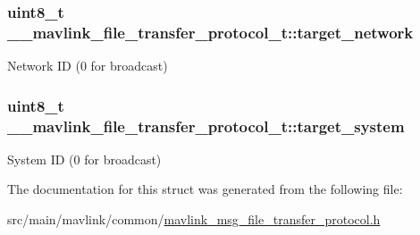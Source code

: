 \hypertarget{struct____mavlink__file__transfer__protocol__t_a183206976ca740c583a75d27187930c3}{
\subsubsection[{target\+\_\+network}]{\setlength{\rightskip}{0pt plus 5cm}uint8\+\_\+t \+\_\+\+\_\+mavlink\+\_\+file\+\_\+transfer\+\_\+protocol\+\_\+t\+::target\+\_\+network}}\label{struct____mavlink__file__transfer__protocol__t_a183206976ca740c583a75d27187930c3}


Network I\+D (0 for broadcast) 

\hypertarget{struct____mavlink__file__transfer__protocol__t_a83dbc333e5c1749cd5ca3920e2c2882c}{
\subsubsection[{target\+\_\+system}]{\setlength{\rightskip}{0pt plus 5cm}uint8\+\_\+t \+\_\+\+\_\+mavlink\+\_\+file\+\_\+transfer\+\_\+protocol\+\_\+t\+::target\+\_\+system}}\label{struct____mavlink__file__transfer__protocol__t_a83dbc333e5c1749cd5ca3920e2c2882c}


System I\+D (0 for broadcast) 



The documentation for this struct was generated from the following file\+:\begin{DoxyCompactItemize}
\item 
src/main/mavlink/common/\hyperlink{mavlink__msg__file__transfer__protocol_8h}{mavlink\+\_\+msg\+\_\+file\+\_\+transfer\+\_\+protocol.\+h}\end{DoxyCompactItemize}
